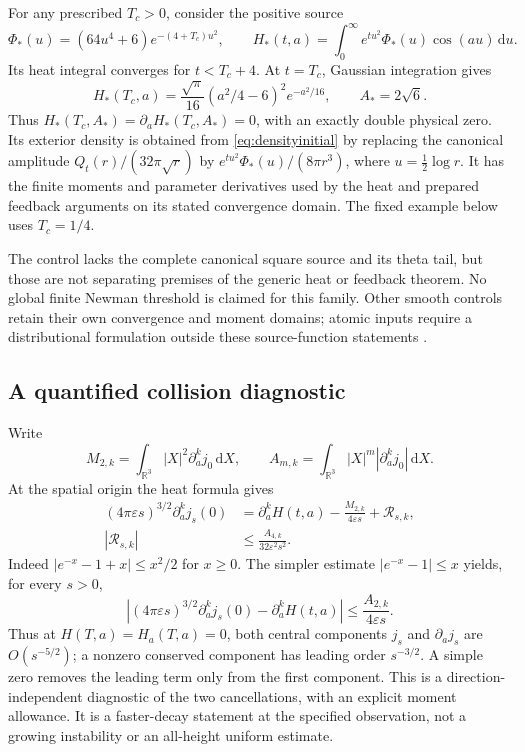\documentclass[11pt]{article}
\numberwithin{equation}{section}
\newcommand{\dd}{\,\mathrm d}
\begin{document}
For any prescribed $T_c>0$, consider the positive source
\begin{equation}\label{eq:control}
 \Phi_*(u)=(64u^4+6)e^{-(4+T_c)u^2},\qquad
 H_*(t,a)=\int_0^\infty e^{tu^2}\Phi_*(u)\cos(au)\dd u.
\end{equation}
Its heat integral converges for $t<T_c+4$. At $t=T_c$, Gaussian
integration gives
\begin{equation}\label{eq:controlevent}
 H_*(T_c,a)=\frac{\sqrt\pi}{16}(a^2/4-6)^2e^{-a^2/16},
 \qquad A_*=2\sqrt6.
\end{equation}
Thus $H_*(T_c,A_*)=\partial_aH_*(T_c,A_*)=0$, with an exactly
double physical zero. Its exterior density is obtained from
\eqref{eq:densityinitial} by replacing the canonical amplitude
$Q_t(r)/(32\pi\sqrt r)$ by
$e^{tu^2}\Phi_*(u)/(8\pi r^3)$, where $u=\frac12\log r$.
It has the finite moments and parameter derivatives used by the heat
and prepared feedback arguments on its stated convergence domain.
The fixed example below uses $T_c=1/4$.

The control lacks the complete canonical square source and its theta
tail, but those are not separating premises of the generic heat or
feedback theorem. No global finite Newman threshold is claimed for this
family. Other smooth controls retain their own convergence and moment
domains; atomic inputs require a distributional formulation outside
these source-function statements \cite{CollisionControls}.

\subsection{A quantified collision diagnostic}

Write
\[
M_{2,k}=\int_{\mathbb R^3}|X|^2\partial_a^k j_0\dd X,\qquad
A_{m,k}=\int_{\mathbb R^3}|X|^m|\partial_a^k j_0|\dd X.
\]
At the spatial origin the heat formula gives
\begin{align}
(4\pi\varepsilon s)^{3/2}\partial_a^k j_s(0)
 &=\partial_a^kH(t,a)-\frac{M_{2,k}}{4\varepsilon s}
                         +\mathcal R_{s,k},\label{eq:heatdiagnostic}\\
|\mathcal R_{s,k}|&\le\frac{A_{4,k}}{32\varepsilon^2s^2}.
\end{align}
Indeed $|e^{-x}-1+x|\le x^2/2$ for $x\ge0$.
The simpler estimate $|e^{-x}-1|\le x$ yields, for every $s>0$,
\begin{equation}\label{eq:heatdiagnosticbound}
\left|(4\pi\varepsilon s)^{3/2}\partial_a^k j_s(0)
                         -\partial_a^kH(t,a)\right|
\le\frac{A_{2,k}}{4\varepsilon s}.
\end{equation}
Thus at $H(T,a)=H_a(T,a)=0$, both central components $j_s$ and
$\partial_a j_s$ are $O(s^{-5/2})$; a nonzero conserved component has
leading order $s^{-3/2}$. A simple zero removes the leading term only
from the first component. This is a direction-independent diagnostic
of the two cancellations, with an explicit moment allowance.
It is a faster-decay statement at the specified observation, not a
growing instability or an all-height uniform estimate.
\end{document}

